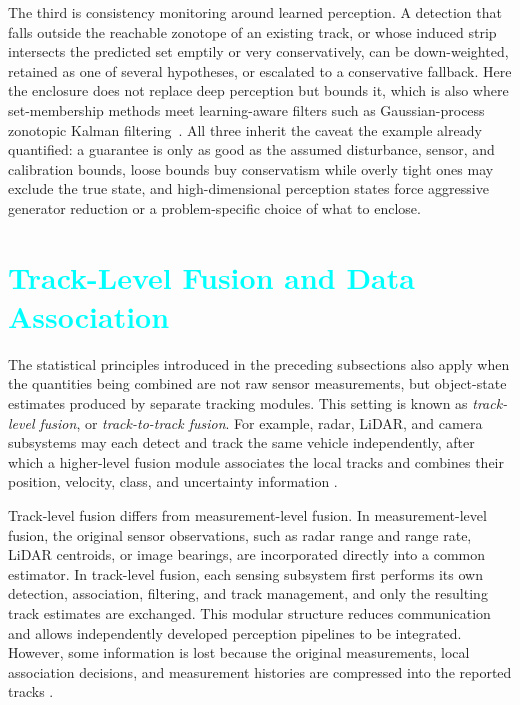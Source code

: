 \documentclass[11pt,oneside,openany]{book}
\newcommand{\TC}[1]{\textcolor{cyan}{#1}}
\begin{document}
The third is consistency monitoring around learned perception. A detection that
falls outside the reachable zonotope of an existing track, or whose induced strip
intersects the predicted set emptily or very conservatively, can be down-weighted,
retained as one of several hypotheses, or escalated to a conservative fallback.
Here the enclosure does not replace deep perception but bounds it, which is also
where set-membership methods meet learning-aware filters such as Gaussian-process
zonotopic Kalman filtering~\cite{li2022_gp_zkf}. All three inherit the caveat
the example already quantified: a guarantee is only as good as the assumed
disturbance, sensor, and calibration bounds, loose bounds buy conservatism while
overly tight ones may exclude the true state, and high-dimensional perception
states force aggressive generator reduction or a problem-specific choice of what
to enclose.
\color{black}

%
\section{\TC{Track-Level Fusion and Data Association}}
\label{subsec:track-fusion}
%

The statistical principles introduced in the preceding subsections also apply when the quantities being combined are not raw sensor measurements, but object-state estimates produced by separate tracking modules. This setting is known as \emph{track-level fusion}, or \emph{track-to-track fusion}. For example, radar, LiDAR, and camera subsystems may each detect and track the same vehicle independently, after which a higher-level fusion module associates the local tracks and combines their position, velocity, class, and uncertainty information \cite{liggins_handbook_2009,khaleghi_multisensor_2013,
barshalom1995multitarget,barshalom2011tracking}.

Track-level fusion differs from measurement-level fusion. In
measurement-level fusion, the original sensor observations, such as radar range and range rate, LiDAR centroids, or image bearings, are incorporated directly into a common estimator. In track-level fusion, each sensing subsystem first performs its own detection, association, filtering, and track management, and only the resulting track estimates are exchanged. This modular structure reduces communication and allows independently developed perception pipelines to be integrated. However, some information
is lost because the original measurements, local association decisions, and measurement histories are compressed into the reported tracks \cite{blackman1999design,barshalom2011tracking}.
\end{document}

